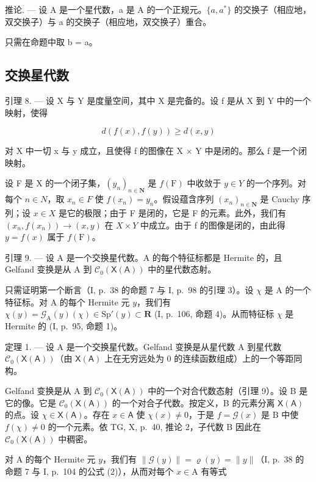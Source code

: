 推论. --- 设 A 是一个星代数，a 是 A 的一个正规元。\(\{a, a^{*}\}\) 的交换子（相应地，双交换子）与 a 的交换子（相应地，双交换子）重合。

只需在命题中取 b = a。

\subsection{交换星代数}

引理 8. --- 设 X 与 Y 是度量空间，其中 X 是完备的。设 f 是从 X 到 Y 中的一个映射，使得

\[
d (f (x), f (y)) \geqslant d (x, y)
\]

对 X 中一切 x 与 y 成立，且使得 f 的图像在 X × Y 中是闭的。那么 f 是一个闭映射。

设 F 是 X 的一个闭子集，\((y_{n})_{n\in\mathbf{N}}\) 是 \(f(\mathrm{F})\) 中收敛于 \(y\in Y\) 的一个序列。对每个 \(n\in N\)，取 \(x_{n}\in F\) 使 \(f(x_{n})=y_{n}\)。假设蕴含序列 \((x_{n})_{n\in\mathbf{N}}\) 是 Cauchy 序列；设 \(x\in X\) 是它的极限；由于 F 是闭的，它是 F 的元素。此外，我们有 \((x_{n},f(x_{n}))\to(x,y)\) 在 \(X\times Y\) 中成立。由于 f 的图像是闭的，由此得 \(y=f(x)\) 属于 \(f(\mathrm{F})\)。

引理 9. --- 设 A 是一个交换星代数。A 的每个特征标都是 Hermite 的，且 Gelfand 变换是从 A 到 \(\mathcal{C}_{0}(\mathsf{X}(\mathsf{A}))\) 中的星代数态射。

只需证明第一个断言（I, p.~38 的命题 7 与 I, p.~98 的引理 3）。设 \(\chi\) 是 A 的一个特征标。对 A 的每个 Hermite 元 \(y\)，我们有 \(\chi(y) = \mathcal{G}_{\mathrm{A}}(y)(\chi) \in \mathrm{Sp}'(y) \subset \mathbf{R}\) (I, p.~106, 命题 4)。从而特征标 \(\chi\) 是 Hermite 的 (I, p.~95, 命题 1)。

定理 1. --- 设 A 是一个交换星代数。Gelfand 变换是从星代数 A 到星代数 \(\mathcal{C}_{0}(\mathsf{X}(\mathsf{A}))\)（由 \(\mathsf{X}(\mathsf{A})\) 上在无穷远处为 0 的连续函数组成）上的一个等距同构。

Gelfand 变换是从 A 到 \(\mathcal{C}_{0}(\mathsf{X}(\mathsf{A}))\) 中的一个对合代数态射（引理 9）。设 B 是它的像。它是 \(\mathcal{C}_{0}(\mathsf{X}(\mathsf{A}))\) 的一个对合子代数。按定义，B 的元素分离 \(\mathsf{X}(\mathsf{A})\) 的点。设 \(\chi \in \mathsf{X}(\mathsf{A})\)。存在 \(x \in \mathsf{A}\) 使 \(\chi(x) \neq 0\)，于是 \(f = \mathcal{G}(x)\) 是 B 中使 \(f(\chi) \neq 0\) 的一个元素。依 TG, X, p.~40, 推论 2，子代数 B 因此在 \(\mathcal{C}_{0}(\mathsf{X}(\mathsf{A}))\) 中稠密。

对 A 的每个 Hermite 元 \(y\)，我们有 \(\| \mathcal{G}(y)\| = \varrho (y) = \| y\|\)（I, p.~38 的命题 7 与 I, p.~104 的公式 (2)），从而对每个 \(x\in \mathrm{A}\) 有等式


